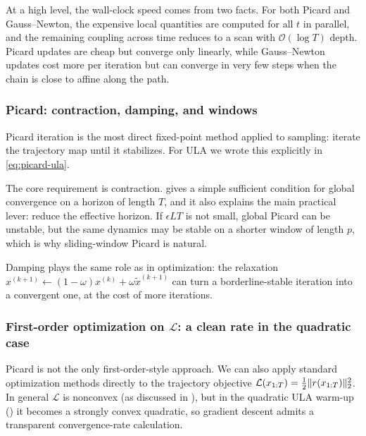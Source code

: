\documentclass[11pt]{article}
\begin{document}
At a high level, the wall-clock speed comes from two facts.
For both Picard and Gauss--Newton, the expensive local quantities are computed for all $t$ in parallel, and the remaining coupling across time reduces to a scan with $\mathcal{O}(\log T)$ depth.
Picard updates are cheap but converge only linearly, while Gauss--Newton updates cost more per iteration but can converge in very few steps when the chain is close to affine along the path.

\subsubsection{Picard: contraction, damping, and windows}
\label{subsubsec:when-works-picard}

Picard iteration is the most direct fixed-point method applied to sampling: iterate the trajectory map until it stabilizes.
For ULA we wrote this explicitly in \eqref{eq:picard-ula}.

The core requirement is contraction.
 gives a simple sufficient condition for global convergence on a horizon of length $T$, and it also explains the main practical lever: reduce the effective horizon.
If $\epsilon L T$ is not small, global Picard can be unstable, but the same dynamics may be stable on a shorter window of length $p$, which is why sliding-window Picard is natural.

Damping plays the same role as in optimization: the relaxation $x^{(k+1)}\gets (1-\omega)x^{(k)}+\omega \tilde x^{(k+1)}$ can turn a borderline-stable iteration into a convergent one, at the cost of more iterations.

\subsubsection{First-order optimization on \texorpdfstring{$\mathcal{L}$}{L}: a clean rate in the quadratic case}
\label{subsubsec:when-works-gd}

Picard is not the only first-order-style approach.
We can also apply standard optimization methods directly to the trajectory objective $\mathcal{L}(x_{1:T})=\tfrac12\lVert r(x_{1:T})\rVert_2^2$.
In general $\mathcal{L}$ is nonconvex (as discussed in ), but in the quadratic ULA warm-up () it becomes a strongly convex quadratic, so gradient descent admits a transparent convergence-rate calculation.
\end{document}

